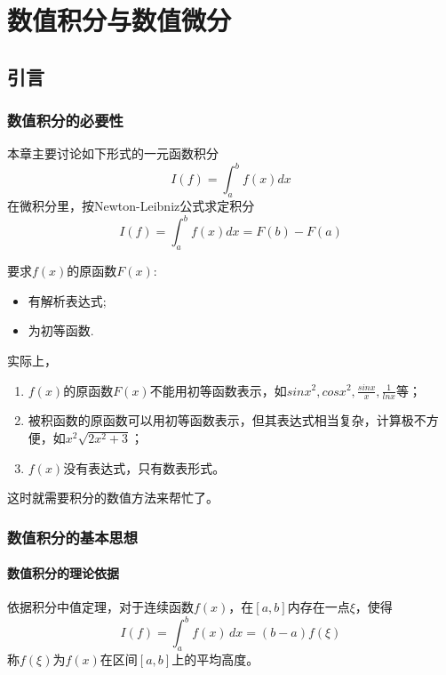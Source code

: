 \chapter{数值积分与数值微分}

\section{引言}

\subsection{数值积分的必要性}
本章主要讨论如下形式的一元函数积分
\begin{equation*}
    I(f) = \int_{a}^{b}f(x)dx
\end{equation*}
在微积分里，按Newton-Leibniz公式求定积分
\begin{equation*}
    I(f) = \int_{a}^{b}f(x)dx = F(b)-F(a)
\end{equation*}

要求$f(x)$的原函数$F(x)$:
\begin{itemize}
    \item 有解析表达式;
    \item 为初等函数.
\end{itemize}

实际上，
\begin{enumerate}
    \item $f(x)$的原函数$F(x)$不能用初等函数表示，如$sinx^2,cosx^2,\frac{sinx}{x},\frac{1}{lnx}$等；
    \item 被积函数的原函数可以用初等函数表示，但其表达式相当复杂，计算极不方便，如$x^2\sqrt{2x^2+3}$；
    \item $f(x)$没有表达式，只有数表形式。
\end{enumerate}
这时就需要积分的数值方法来帮忙了。

\subsection{数值积分的基本思想}
\subsubsection{数值积分的理论依据}
依据积分中值定理，对于连续函数$f(x)$，在$[a,b]$内存在一点$\xi $，使得
    \begin{equation}
       I(f) = \int_{a}^{b}f(x)\,dx = (b-a)f(\xi )
    \end{equation}
称$f(\xi )$为$f(x)$在区间$[a,b]$上的平均高度。


